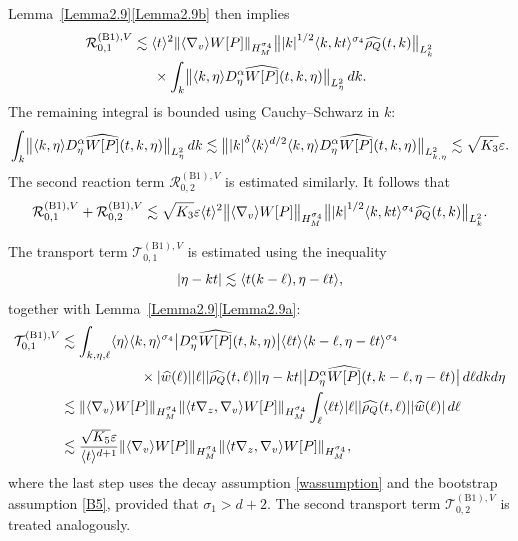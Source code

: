\documentclass[JEP,XML,SOM,Unicode]{cedram}
\newcommand{\bnorm}[1]{\bigl\|#1\bigr\|}
\newcommand{\babs}[1]{\bigl|#1\bigr|}
\theoremstyle{plain}
\theoremstyle{remark}
\newcommand{\ak}{\abs{k}}
\newcommand{\jb}[1]{\langle#1\rangle}
\newcommand{\ep}{\varepsilon}
\begin{document}
\pagebreak[2]\noindent
Lemma~\ref{Lemma2.9}\eqref{Lemma2.9b} then implies
\begin{multline*}
\mathcal{R}_{0,1}^{\mathrm{(B1)},V}\lesssim\jb{t}^2\norm{\jb{\nabla_v}W[P]}_{H^{\sigma_4}_M}\bnorm{\ak^{1/2}\jb{k,kt}^{\sigma_4}\widehat{\rho_Q}(t,k)}_{L^2_k}\\
{}\times\int_k\bnorm{\jb{k,\eta}D^\alpha_\eta\widehat{W[P]}(t,k,\eta)}_{L^2_\eta}\,dk.
\end{multline*}
The remaining integral is bounded using Cauchy--Schwarz in $k$:
\begin{align*}
\int_k\bnorm{\jb{k,\eta}D^\alpha_\eta\widehat{W[P]}(t,k,\eta)}_{L^2_\eta}\,dk\lesssim\bnorm{\ak^\delta\jb{k}^{d/2}\jb{k,\eta}D^\alpha_\eta\widehat{W[P]}(t,k,\eta)}_{L^2_{k,\eta}}\lesssim \sqrt{K_3}\ep.
\end{align*}
The second reaction term \(\mathcal{R}_{0,2}^{\mathrm{(B1)},V}\) is estimated similarly. It follows that
\begin{align*}
\mathcal{R}_{0,1}^{\mathrm{(B1)},V}+\mathcal{R}_{0,2}^{\mathrm{(B1)},V}\lesssim\sqrt{K_3}\ep\jb{t}^2\bnorm{\jb{\nabla_v}W[P]}_{H^{\sigma_4}_M}\bnorm{\ak^{1/2}\jb{k,kt}^{\sigma_4}\widehat{\rho_Q}(t,k)}_{L^2_k}.
\end{align*}

The transport term $\mathcal{T}_{0,1}^{\mathrm{(B1)},V}$ is estimated using the inequality
\[
\abs{\eta - kt} \lesssim \jb{t(k - \ell), \eta - \ell t},
\]
together with Lemma~\ref{Lemma2.9}\eqref{Lemma2.9a}:
\begin{align*}
\mathcal{T}_{0,1}^{\mathrm{(B1)},V}&\lesssim\int_{k,\eta,\ell }\jb{\eta}\jb{k,\eta}^{\sigma_4}\babs{D_\eta^\alpha \widehat{W[P]}(t,k,\eta)}\jb{\ell t}\jb{k-\ell ,\eta-\ell t}^{\sigma_4}\\
&\hspace{2cm}\times\abs{\widehat{w}(\ell )}\abs{\ell }\abs{\widehat{\rho_Q}(t,\ell )}\abs{\eta-kt}\babs{D_\eta^\alpha\widehat{W[P]}(t,k-\ell ,\eta-\ell t)}\,d\ell dkd\eta\\
&\lesssim\norm{\jb{\nabla_v}W[P]}_{H^{\sigma_4}_M}\norm{\jb{t\nabla_z,\nabla_v}W[P]}_{H^{\sigma_4}_M}\int_\ell\jb{\ell t}\abs{\ell }\abs{\widehat{\rho_Q}(t,\ell )}\abs{\widehat w(\ell )}\,d\ell \\
&\lesssim \frac{\sqrt{K_5}\ep}{\jb{t}^{d+1}}\norm{\jb{\nabla_v}W[P]}_{H^{\sigma_4}_M}\norm{\jb{t\nabla_z,\nabla_v}W[P]}_{H^{\sigma_4}_M},
\end{align*}
where the last step uses the decay assumption \eqref{wassumption} and the bootstrap assumption \eqref{B5}, provided that $\sigma_1 > d + 2$. The second transport term $\mathcal{T}_{0,2}^{\mathrm{(B1)},V}$ is treated analogously.
\end{document}
